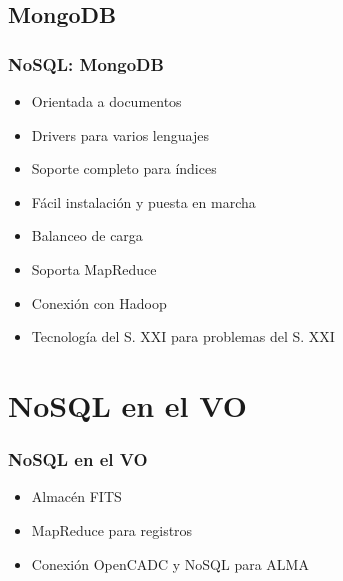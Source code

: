 \documentclass[serif,12pt]{beamer}
\begin{document}
\subsection{MongoDB}
\begin{frame}
\frametitle{NoSQL: MongoDB}

\begin{itemize}
\item Orientada a documentos
\item Drivers para varios lenguajes
\item Soporte completo para índices
\item Fácil instalación y puesta en marcha
\item Balanceo de carga
\item Soporta MapReduce
\item Conexión con Hadoop
\item Tecnología del S. XXI para problemas del S. XXI
\end{itemize}


\end{frame}

\section{NoSQL en el VO}
\begin{frame}
\frametitle{NoSQL en el VO}

\begin{itemize}
\item Almacén FITS
\item MapReduce para registros
\item Conexión OpenCADC y NoSQL para ALMA
\end{itemize}


\end{frame}


\end{document}
